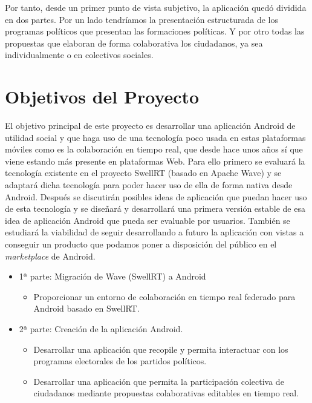 Por tanto, desde un primer punto de vista subjetivo, la aplicación quedó dividida en dos partes. Por un lado tendríamos la presentación estructurada de los programas políticos que presentan las formaciones políticas. Y por otro todas las propuestas que elaboran de forma colaborativa los ciudadanos, ya sea individualmente o en colectivos sociales.
 
 
\section{Objetivos del Proyecto}

El objetivo principal de este proyecto es desarrollar una aplicación Android de utilidad social y que haga uso de una tecnología poco usada en estas plataformas móviles como es la colaboración en tiempo real, que desde hace unos años sí que viene estando más presente en plataformas Web. Para ello primero se evaluará la tecnología existente en el proyecto SwellRT (basado en Apache Wave) y se adaptará dicha tecnología para poder hacer uso de ella de forma nativa desde Android. Después se discutirán posibles ideas de aplicación que puedan hacer uso de esta tecnología y se diseñará y desarrollará una primera versión estable de esa idea de aplicación Android que pueda ser evaluable por usuarios. También se estudiará la viabilidad de seguir desarrollando a futuro la aplicación con vistas a conseguir un producto que podamos poner a disposición del público en el \textit{marketplace} de Android.

\begin{itemize}
  \item {
    1ª parte: Migración de Wave (SwellRT) a Android
    \begin{itemize}
      \item Proporcionar un entorno de colaboración en tiempo real federado para Android basado en SwellRT.
    \end{itemize}
  }
  \item {
    2ª parte: Creación de la aplicación Android.
    \begin{itemize}
      \item Desarrollar una aplicación que recopile y permita interactuar con los programas electorales de los partidos políticos.
      \item Desarrollar una aplicación que permita la participación colectiva de ciudadanos mediante propuestas colaborativas editables en tiempo real.
    \end{itemize}
  }
\end{itemize}

